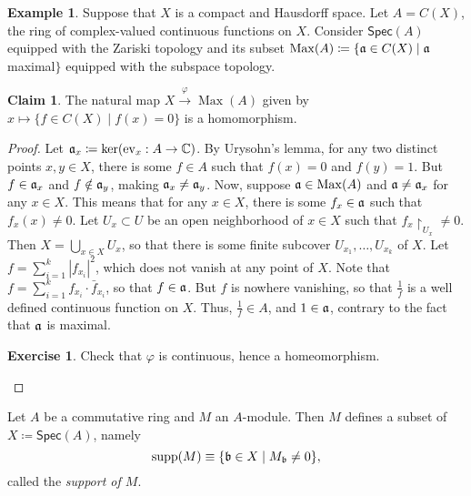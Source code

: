 \documentclass[10pt,letterpaper,cm]{nupset}
\theoremstyle{definition}
\newtheorem{exmp}[definition]{Example}
\theoremstyle{theorem}
\newtheorem*{claim}{Claim}
\newtheorem{exercise}[definition]{Exercise}
\theoremstyle{remark}
\newcommand{\C}{\mathbb C}
\newcommand{\1}{\mathbf{1}}
\newcommand{\0}{\vec 0}
\DeclareMathOperator{\ev}{ev}
\DeclareMathOperator{\Max}{Max}
\DeclareMathOperator{\supp}{supp}
\begin{document}
\begin{exmp}
Suppose that $X$ is a compact and Hausdorff space. Let $A = C(X)$, the ring of complex-valued continuous functions on $X$. Consider $\mathsf{Spec}(A)$ equipped with the Zariski topology and its subset $\Max(A) \coloneqq  \{\frak{a} \in C(X) \mid \frak{a}$ maximal$\}$ equipped with the subspace topology.
\begin{claim}
The natural map $X \overset{\varphi}{\longrightarrow} {\Max(A)}$ given by $x \mapsto \{f\in C(X) \mid f(x) = 0\}$ is a homomorphism.
\end{claim}
\begin{proof}
Let $\frak{a}_x \coloneqq  \ker(\ev_x : A \to \C)$.
By Urysohn's lemma, for any two distinct points $x,y \in X$, there is some $f\in A$ such that $f(x) = 0$ and $f(y) =1$. But $f \in \frak{a}_x$ and $f\notin \frak{a}_y$, making $\frak{a}_x \ne \frak{a}_y$.  Now, suppose $\frak{a} \in \Max(A)$ and $\frak{a} \ne \frak{a}_x$ for any $x\in X$. This means that for any $x\in X$, there is some $f_x \in \frak{a}$ such that $f_x(x) \ne 0$. Let $U_x \subset U$ be an open neighborhood of $x\in X$ such that $f_x \restriction_{U_x} \ne 0$.  Then $X = \bigcup_{x\in X} U_x$, so that there is some finite subcover $U_{x_1}, \ldots, U_{x_k}$ of $X$.  Let $f = \sum_{i=1}^k \left\lvert{f_{x_i}}\right\rvert^2$, which does not vanish at any point of $X$. Note that $f = \sum_{i=1}^k f_{x_i} \cdot \bar{f}_{x_i}$, so that $f\in \frak{a}$. But $f$ is nowhere vanishing, so that $\frac{1}{f}$ is a well defined continuous function on $X$. Thus, $\frac{1}{f} \in A$, and $1\in \frak{a}$, contrary to the fact that $\frak{a}$ is maximal. 
\begin{exercise}
Check that $\varphi$ is continuous, hence a homeomorphism. 
\end{exercise}
\end{proof}
\end{exmp}

\medskip

Let $A$ be  a commutative ring and $M$ an $A$-module. Then $M$ defines a subset of $X\coloneqq  \mathsf{Spec}(A)$, namely $$\supp(M) \equiv \{ \frak{b} \in X \mid M_{\frak{b}} \ne 0\},  $$ called the \textit{support of $M$}.
\end{document}
